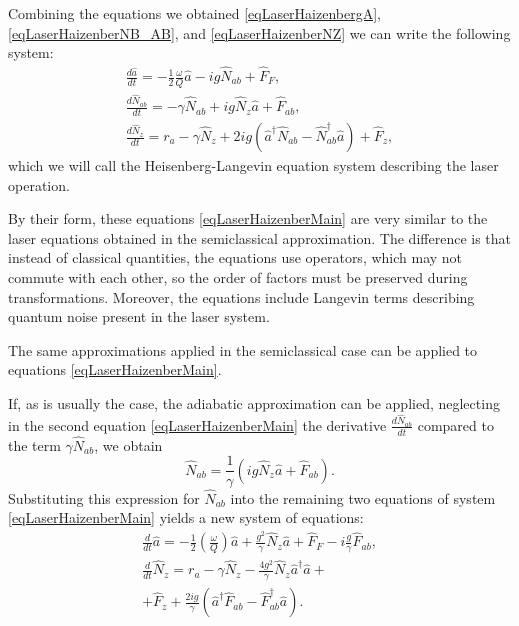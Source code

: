 Combining the equations we obtained \eqref{eqLaserHaizenbergA}, 
\eqref{eqLaserHaizenberNB_AB}, and
\eqref{eqLaserHaizenberNZ} we can write the following
system:
\begin{eqnarray}
\frac{d \hat{a}}{d t} = 
- \frac{1}{2}\frac{\omega}{Q}\hat{a}
-i g \hat{N}_{ab} + 
\hat{F}_F,
\nonumber \\
\frac{d \hat{N}_{ab}}{d t} = 
- \gamma \hat{N}_{ab} 
+ i g \hat{N}_{z} \hat{a} 
 + \hat{F}_{ab},
\nonumber \\
\frac{d \hat{N}_z}{d t} = r_a
- \gamma \hat{N}_{z} +
2 i g 
 \left(
\hat{a}^{\dag}\hat{N}_{ab} -
\hat{N}_{ab}^{\dag}\hat{a}
\right) + \hat{F}_{z},
\label{eqLaserHaizenberMain}
\end{eqnarray}
which we will call the Heisenberg-Langevin equation system
describing the laser operation.

By their form, these equations \eqref{eqLaserHaizenberMain} are very similar
to the laser equations obtained in the semiclassical
approximation. The difference is that 
instead of classical quantities, the equations use operators, which
may not commute with each other, so the order of factors must be preserved
during transformations. Moreover, the equations include Langevin terms describing quantum
noise present in the laser system.

The same approximations applied in the
semiclassical case can be applied to equations \eqref{eqLaserHaizenberMain}.

If, as is usually the case, 
the adiabatic approximation can be applied,
neglecting in the second equation \eqref{eqLaserHaizenberMain} the derivative
$\frac{d\hat{N}_{ab}}{d t}$ compared to the term $\gamma
\hat{N}_{ab}$, we obtain
\begin{equation}
\hat{N}_{ab} = \frac{1}{\gamma} \left(i g \hat{N}_z\hat{a} +
\hat{F}_{ab}\right).
\nonumber
\end{equation}
Substituting this expression for $\hat{N}_{ab}$ into the remaining two equations
of system \eqref{eqLaserHaizenberMain} yields a new
system of equations:
\begin{eqnarray}
\frac{d}{dt} \hat{a} = -
\frac{1}{2}\left(\frac{\omega}{Q}\right)\hat{a} + \frac{g^2}{\gamma}
\hat{N}_z\hat{a} + \hat{F}_F - i\frac{g}{\gamma}\hat{F}_{ab},
\nonumber \\
\frac{d}{dt}\hat{N}_z = r_a -
\gamma\hat{N}_z - \frac{4g^2}{\gamma}
\hat{N}_z\hat{a}^{\dag}\hat{a} +
\nonumber \\
+ \hat{F}_z + \frac{2ig}{\gamma} \left(\hat{a}^{\dag}\hat{F}_{ab} -
\hat{F}_{ab}^{\dag}\hat{a}\right).
\label{eqLaserHaizenberg16add}
\end{eqnarray}

